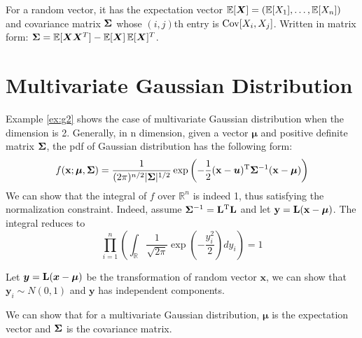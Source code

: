For a random vector, it has the expectation vector $\operatorname{\mathbb{E}}[\bm{X}] = (\operatorname{\mathbb{E}}[X_1], \dots, \operatorname{\mathbb{E}}[X_n])$ and covariance matrix $\mathbf{\Sigma} $ whose $(i,j)$th entry is $\operatorname{Cov}[X_i, X_j]$. Written in matrix form:
$ \mathbf{\Sigma} = \operatorname{\mathbb{E}}[\bm{X}\bm{X}^T] - \operatorname{\mathbb{E}}[\bm{X}] \operatorname{\mathbb{E}}[\bm{X}]^T $.

\section{Multivariate Gaussian Distribution}
Example \ref{ex:g2} shows the case of multivariate Gaussian distribution when the dimension is 2. Generally, in n dimension, given a vector $\bm{\mu}$ and positive definite matrix $\mathbf{\Sigma}$, the pdf of Gaussian distribution has the following form:
\begin{equation}
f(\mathbf{x}; \bm{\mu}, \mathbf{\Sigma}) = \frac{1}{(2\pi)^{n/2} \lvert\mathbf{\Sigma}\rvert^{1/2}} \exp \left(-\frac{1}{2} (\mathbf{x} - \bm{u})^{\mathrm{T}} \mathbf{\Sigma}^{-1} (\mathbf{x} - \bm{\mu})\right)
\end{equation}
We can show that the integral of $f$ over $\mathbb{R}^n$ is indeed 1, thus satisfying the normalization constraint. Indeed, assume $\mathbf{\Sigma}^{-1} = \mathbf{L}^{\mathrm{T}} \mathbf{L}$ and let $\mathbf{y} = \mathbf{L} (\mathbf{x} - \bm{\mu})$. The integral reduces to
$$
\prod_{i=1}^n \left(\int_{\mathbb{R}}\frac{1}{\sqrt{2\pi}} \exp(-\frac{y^2_i}{2}) dy_i\right) = 1
$$

Let $\bm{y} = \mathbf{L} (\bm{x} - \bm{\mu})$ be the transformation of random vector $\bm{x}$, we can show that $\bm{y}_i \sim N(0, 1)$ and $\bm{y}$ has independent components.  

We can show that for a multivariate Gaussian distribution, $\bm{\mu}$ is the expectation vector and $\mathbf{\Sigma}$ is the covariance matrix.